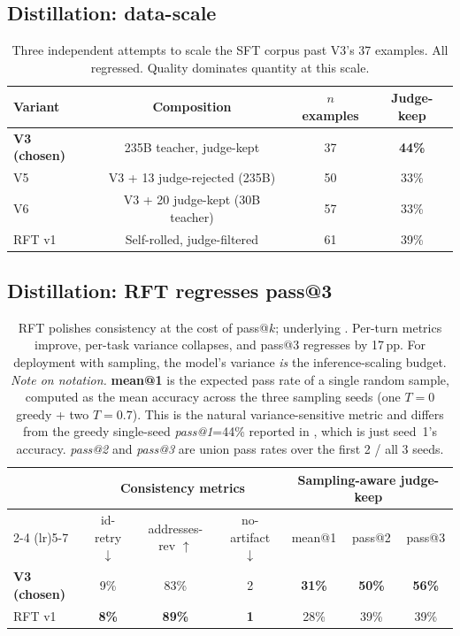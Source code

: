 \subsection{Distillation: data-scale}
\begin{table}[H]
\centering
\caption{Three independent attempts to scale the SFT corpus past V3's 37 examples. All regressed. Quality dominates quantity at this scale.}
\label{tab:distill-datascale}
\begin{tabular}{lccc}
\toprule
Variant & Composition & $n$ examples & Judge-keep \\
\midrule
\textbf{V3 (chosen)} & 235B teacher, judge-kept       & 37 & \textbf{44\%} \\
V5                   & V3 + 13 judge-rejected (235B)  & 50 & 33\% \\
V6                   & V3 + 20 judge-kept (30B teacher) & 57 & 33\% \\
RFT v1               & Self-rolled, judge-filtered    & 61 & 39\% \\
\bottomrule
\end{tabular}
\end{table}

\subsection{Distillation: RFT regresses pass@3}
\begin{table}[H]
\centering
\caption{RFT polishes consistency at the cost of pass@$k$; underlying . Per-turn metrics improve, per-task variance collapses, and pass@3 regresses by 17\,pp. For deployment with sampling, the model's variance \emph{is} the inference-scaling budget. \textit{Note on notation.} \textbf{mean@1} is the expected pass rate of a single random sample, computed as the mean accuracy across the three sampling seeds (one $T{=}0$ greedy + two $T{=}0.7$). This is the natural variance-sensitive metric and differs from the greedy single-seed \emph{pass@1}=44\% reported in , which is just seed~1's accuracy. \emph{pass@2} and \emph{pass@3} are union pass rates over the first 2 / all 3 seeds.}
\label{tab:distill-rft}
\small
\begin{tabular}{lcccccc}
\toprule
& \multicolumn{3}{c}{Consistency metrics} & \multicolumn{3}{c}{Sampling-aware judge-keep} \\
\cmidrule(lr){2-4} \cmidrule(lr){5-7}
& id-retry $\downarrow$ & addresses-rev $\uparrow$ & no-artifact $\downarrow$ & mean@1 & pass@2 & pass@3 \\
\midrule
\textbf{V3 (chosen)} & 9\%  & 83\% & 2  & \textbf{31\%} & \textbf{50\%} & \textbf{56\%} \\
RFT v1               & \textbf{8\%}  & \textbf{89\%} & \textbf{1}  & 28\%   & 39\%   & 39\% \\
\bottomrule
\end{tabular}
\end{table}

